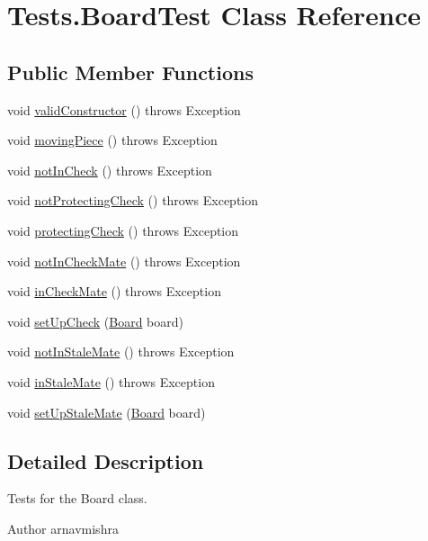 \hypertarget{class_tests_1_1_board_test}{}\section{Tests.\+Board\+Test Class Reference}
\label{class_tests_1_1_board_test}
\subsection*{Public Member Functions}
\begin{DoxyCompactItemize}
\item 
void \hyperlink{class_tests_1_1_board_test_a7a85d67a559913d4e5a3b0977daa5309}{valid\+Constructor} ()  throws Exception 
\item 
void \hyperlink{class_tests_1_1_board_test_acd51124659fb2a0eb4f6fcc9b41e8001}{moving\+Piece} ()  throws Exception 
\item 
void \hyperlink{class_tests_1_1_board_test_a929e0f87bd865f7fdf810ab37768f4e8}{not\+In\+Check} ()  throws Exception 
\item 
void \hyperlink{class_tests_1_1_board_test_aa5b9e4cbefe4702bcd89fbc9ee886a29}{not\+Protecting\+Check} ()  throws Exception 
\item 
void \hyperlink{class_tests_1_1_board_test_a59084580ebe6a2c112887b13c1fa63ee}{protecting\+Check} ()  throws Exception 
\item 
void \hyperlink{class_tests_1_1_board_test_a2e13dc59ccbbdb6535ed634b612b2fb1}{not\+In\+Check\+Mate} ()  throws Exception 
\item 
void \hyperlink{class_tests_1_1_board_test_a39bdcd7eb309f039104f07d042d0678f}{in\+Check\+Mate} ()  throws Exception 
\item 
void \hyperlink{class_tests_1_1_board_test_a33895f492ce1d7dfba81b325fa351da0}{set\+Up\+Check} (\hyperlink{class_model_1_1_board}{Board} board)
\item 
void \hyperlink{class_tests_1_1_board_test_a403efc830e97a274bc65ea131dfb0e5f}{not\+In\+Stale\+Mate} ()  throws Exception 
\item 
void \hyperlink{class_tests_1_1_board_test_aaa8c24159f5ef9acbb15b47ae83f8d88}{in\+Stale\+Mate} ()  throws Exception 
\item 
void \hyperlink{class_tests_1_1_board_test_a6e66cbfe15e55e7f65f37a85fd8126b2}{set\+Up\+Stale\+Mate} (\hyperlink{class_model_1_1_board}{Board} board)
\end{DoxyCompactItemize}


\subsection{Detailed Description}
Tests for the Board class. \begin{DoxyAuthor}{Author}
arnavmishra 
\end{DoxyAuthor}


